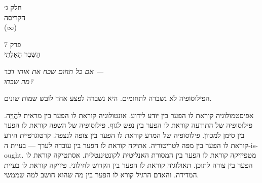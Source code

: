 \documentclass[10pt, openany, oneside]{book}
\renewcommand{\normalsize}{\fontsize{10}{13}\selectfont}
\renewcommand{\large}{\fontsize{11.5}{14}\selectfont}
\renewcommand{\LARGE}{\fontsize{15}{18}\selectfont}
\renewcommand{\huge}{\fontsize{17}{21}\selectfont}
\begin{document}
%
%

\newpage
\thispagestyle{empty}
\vspace*{\fill}
\begin{center}
    {\LARGE\textsc{חלק ג׳}}\\[1em]
    {\large\textsc{הקריסה}}\\[0.5em]
    {\normalsize ($\infty$)}
\end{center}
\vspace*{\fill}
\newpage

%
%
%

\newpage

\begin{center}
    {\huge\textsc{פרק 7}}\\[0.3em]
    {\large\textsc{הַשֶּׁבֶר הָאָלֵתִי}}
\end{center}

\vspace{1.5em}

\begin{center}
    \textit{%
    אם כל תחום שכח את אותו דבר —\\
    מה שכחו?}
\end{center}

\vspace{2em}


\noindent הפילוסופיה לא נשברה לתחומים. היא נשברה לפצע אחד לובש שמות שונים.

אפיסטמולוגיה קוראת לו הפער בין יודע לידוע. אונטולוגיה קוראת לו הפער בין מראית להֲוָיָה. פילוסופיה של התודעה קוראת לו הפער בין נפש לגוף. פילוסופיה של השפה קוראת לו הפער בין סימן למכוון. פילוסופיה של המדע קוראת לו הפער בין צופה לנצפה. קרטוגרפיית הידע קוראת לו הפער בין מפה לטריטוריה. אתיקה קוראת לו הפער בין עובדה לערך — בעיית ה-is-ought. מטפיזיקה קוראת לו הפער בין המסורת האנליטית לקונטיננטלית. אסתטיקה קוראת לו הפער בין צורה לתוכן. תאולוגיה קוראת לו הפער בין הקדוש לחילוני. פיזיקה קוראת לו בעיית המדידה. והאדם הרגיל קורא לו הפער בין מה שהוא חושב למה שממשי.
\end{document}
